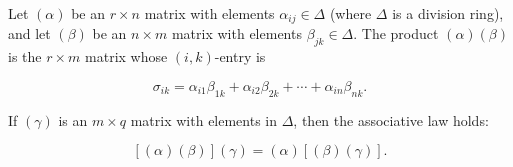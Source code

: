 Let $(\alpha)$ be an $r \times n$ matrix with elements $\alpha_{ij} \in \Delta$ (where $\Delta$ is a division ring), and let $(\beta)$ be an $n \times m$ matrix with elements $\beta_{jk} \in \Delta$. The product $(\alpha)(\beta)$ is the $r \times m$ matrix whose $(i,k)$-entry is

$$\sigma_{ik} = \alpha_{i1}\beta_{1k} + \alpha_{i2}\beta_{2k} + \cdots + \alpha_{in}\beta_{nk}.$$

If $(\gamma)$ is an $m \times q$ matrix with elements in $\Delta$, then the associative law holds:

$$[(\alpha)(\beta)](\gamma) = (\alpha)[(\beta)(\gamma)].$$

